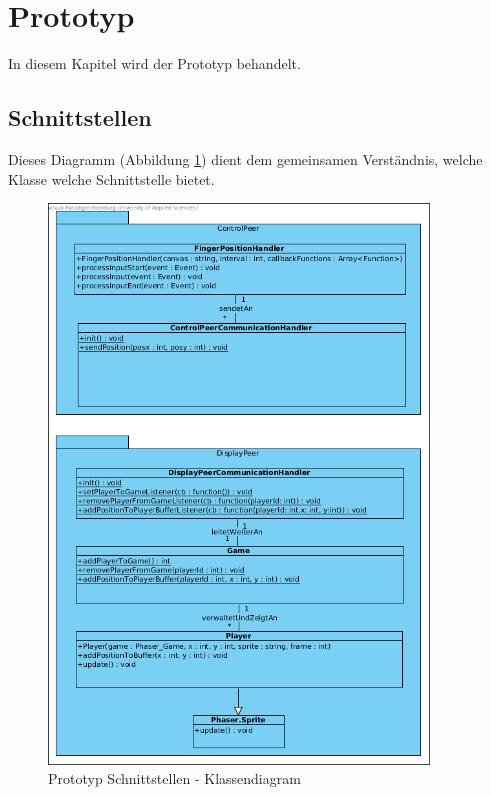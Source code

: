 \section{Prototyp}
In diesem Kapitel wird der Prototyp behandelt.

\subsection{Schnittstellen}
Dieses Diagramm (Abbildung \ref{Prototyp Schnittstellen - Klassendiagram}) dient dem gemeinsamen Verständnis, welche Klasse welche Schnittstelle bietet.
\begin{figure}[ht]
	\centering
	\includegraphics[width=0.9\textwidth]{architecture/PrototypeClassDiagram.png}
	\caption{Prototyp Schnittstellen - Klassendiagram}
	\label{Prototyp Schnittstellen - Klassendiagram}
\end{figure}

